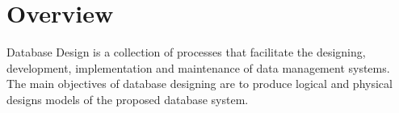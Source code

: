 \documentclass[../../DD.tex]{subfiles}
\begin{document}
\section{Overview}

	Database Design is a collection of processes that facilitate the designing, development, implementation and maintenance of  data management systems. \\
	The main objectives of database designing are to produce logical and physical designs models of the proposed database system.
	
\end{document}
